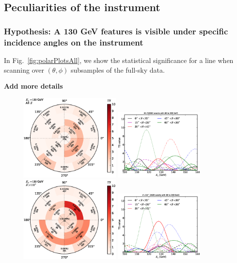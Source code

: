 \documentclass[aps,twocolumn,prd,superscriptaddress,showpacs,nofootinbib,fixfloat]{revtex4}
\begin{document}
\subsection{Peculiarities of the instrument}

\subsubsection{Hypothesis: A 130 GeV features is visible under specific
incidence angles on the instrument}

In Fig.~\ref{fig:polarPlotsAll}, we show the statistical significance for a
line when scanning over $(\theta, \phi)$ subsamples of the full-sky data.

\textbf{Add more details}

\begin{figure}[p]
  \centering
  \includegraphics[width=0.45\textwidth]{plots/polar_all.eps}
  \includegraphics[width=0.40\textwidth]{plots/scan_all.eps}
  \includegraphics[width=0.45\textwidth]{plots/polar_z.GT.110.eps}
  \includegraphics[width=0.40\textwidth]{plots/scan_z.GT.110.eps}

\end{figure}
\end{document}
